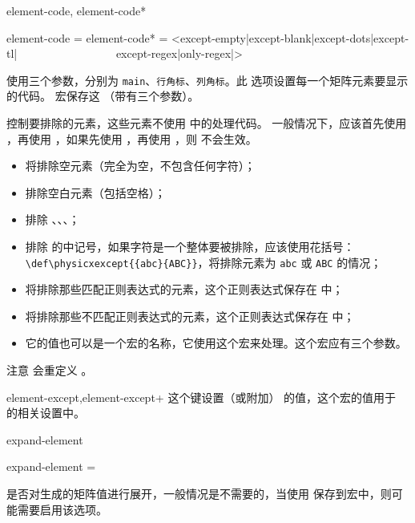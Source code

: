 \documentclass{ctxdoc}
\begin{document}
\begin{function}[updated=2022-04-27]{element-code, element-code*}
    \begin{syntax}
        element-code  = 
        element-code* = <except-empty|except-blank|except-dots|except-tl|
        ~~~~~~~~~~~~~~~~~except-regex|only-regex|>
    \end{syntax}
     使用三个参数，分别为 \verb|main|、\verb|行角标|、\verb|列角标|。此
    选项设置每一个矩阵元素要显示的代码。 宏保存这 （带有三个参数）。

     控制要排除的元素，这些元素不使用  中的处理代码。
    一般情况下，应该首先使用 ，再使用 ，如果先使用 
    ，再使用 ，则  不会生效。
  \begin{itemize}
    \item {} 将排除空元素（完全为空，不包含任何字符）；
    \item {} 排除空白元素（包括空格）；
    \item {} 排除 、、、；
    \item {} 排除  的中记号，如果字符是一个整体要被排除，应该使用花括号：\verb|\def\physicxexcept{{abc}{ABC}}|，将排除元素为 \verb|abc| 或 \verb|ABC| 的情况；
    \item {} 将排除那些匹配正则表达式的元素，这个正则表达式保存在  中；
    \item {} 将排除那些不匹配正则表达式的元素，这个正则表达式保存在  中；
    \item 它的值也可以是一个宏的名称，它使用这个宏来处理。这个宏应有三个参数。
  \end{itemize}

  注意  会重定义 。
\end{function}

\begin{function}{element-except,element-except+}
这个键设置（或附加） 的值，这个宏的值用于  的相关设置中。
\end{function}

\begin{function}{expand-element}
    \begin{syntax}
        expand-element = \TTF {}
    \end{syntax}
    是否对生成的矩阵值进行展开，一般情况是不需要的，当使用  保存到宏中，则可能需要启用该选项。
\end{function}
\end{document}
